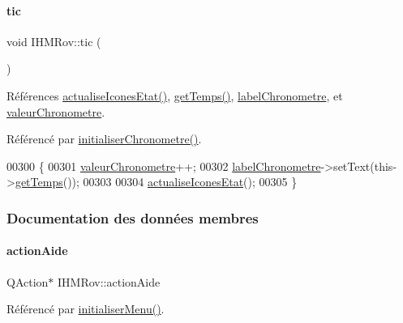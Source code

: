 \paragraph{\texorpdfstring{tic}{tic}}
{\footnotesize\ttfamily void I\+H\+M\+Rov\+::tic (\begin{DoxyParamCaption}{ }\end{DoxyParamCaption})\hspace{0.3cm}{\ttfamily [slot]}}



Références \hyperlink{class_i_h_m_rov_abbfcdc154a6ae7f941d186f6c90a5a2b}{actualise\+Icones\+Etat()}, \hyperlink{class_i_h_m_rov_aa6a269f311d527387ad3c9e22dd12d43}{get\+Temps()}, \hyperlink{class_i_h_m_rov_a32e5cb80ecae7bad6914c690ebd93995}{label\+Chronometre}, et \hyperlink{class_i_h_m_rov_a38ad5c20c2347825c237e9b85bb5c7e6}{valeur\+Chronometre}.



Référencé par \hyperlink{class_i_h_m_rov_a64002e867300c8aff2ebd4568acc107e}{initialiser\+Chronometre()}.


\begin{DoxyCode}
00300 \{
00301     \hyperlink{class_i_h_m_rov_a38ad5c20c2347825c237e9b85bb5c7e6}{valeurChronometre}++;
00302     \hyperlink{class_i_h_m_rov_a32e5cb80ecae7bad6914c690ebd93995}{labelChronometre}->setText(this->\hyperlink{class_i_h_m_rov_aa6a269f311d527387ad3c9e22dd12d43}{getTemps}());
00303 
00304     \hyperlink{class_i_h_m_rov_abbfcdc154a6ae7f941d186f6c90a5a2b}{actualiseIconesEtat}();
00305 \}
\end{DoxyCode}


\subsubsection{Documentation des données membres}
\mbox{\label{class_i_h_m_rov_aecd3c0b54390e60f6e1ba14787c68828}} 
\paragraph{\texorpdfstring{action\+Aide}{actionAide}}
{\footnotesize\ttfamily Q\+Action$\ast$ I\+H\+M\+Rov\+::action\+Aide\hspace{0.3cm}{\ttfamily [private]}}



Référencé par \hyperlink{class_i_h_m_rov_aebbcb2325c2d1a88a012d8408e2d6223}{initialiser\+Menu()}.

